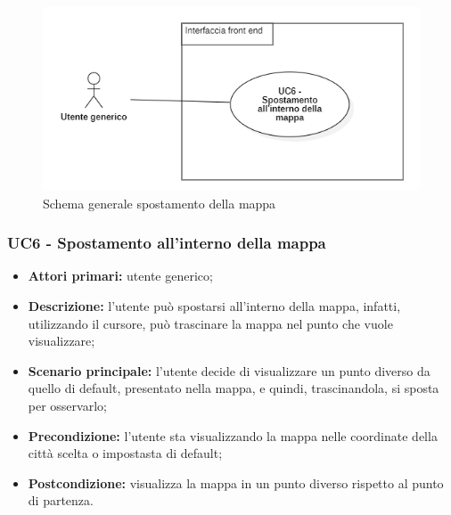 \begin{center}
	\begin{figure}[H]
		\centering\includegraphics[scale=0.8]{../immagini/attori_casi/UC_6.png}
		\caption{Schema generale spostamento della mappa}
	\end{figure}
\end{center}


\subsubsection{UC6 - Spostamento all'interno della mappa}\label{CasiDUsoCasiDUsoTraUnUtenteEIlFrontEndElencoCasiDUsoUC311SpostamentoDelCentroDellaMappa}

\begin{itemize}
	\item \textbf{Attori primari:} utente generico;
	\item \textbf{Descrizione:} l’utente può spostarsi all’interno della mappa, infatti, utilizzando il cursore, può trascinare la mappa nel punto che vuole visualizzare;
	\item \textbf{Scenario principale:} l'utente decide di visualizzare un punto diverso da quello di default, presentato nella mappa, e quindi, trascinandola, si sposta per osservarlo;
	\item \textbf{Precondizione:} l'utente sta visualizzando la mappa nelle coordinate della città scelta o impostasta di default;
	\item \textbf{Postcondizione:} visualizza la mappa in un punto diverso rispetto al punto di partenza.
\end{itemize}

